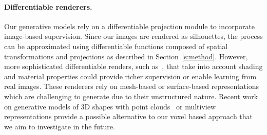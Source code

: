 \paragraph*{Differentiable renderers.} 
Our generative models rely on a
differentiable projection module to incorporate image-based supervision.
Since our images are rendered as silhouettes, the process
can be approximated using differentiable functions composed of spatial
transformations and projections as described in Section~\ref{s:method}. 
However, more sophisticated differentiable renders, such as~\cite{nmr,Liu18,dmc}, that take into
account shading and material properties could provide richer
supervision or enable learning from real images.
These renderers rely on mesh-based or surface-based representations which are
challenging to generate due to their unstructured nature.
Recent work on generative models of 3D shapes with point
clouds~\cite{lin18,mrt,pcagan,psg,atlasnet,latentpc} or multiview~\cite{lun17,tatarchenko2016multi} representations
provide a possible alternative to our voxel based approach that we aim
to investigate in the future.

